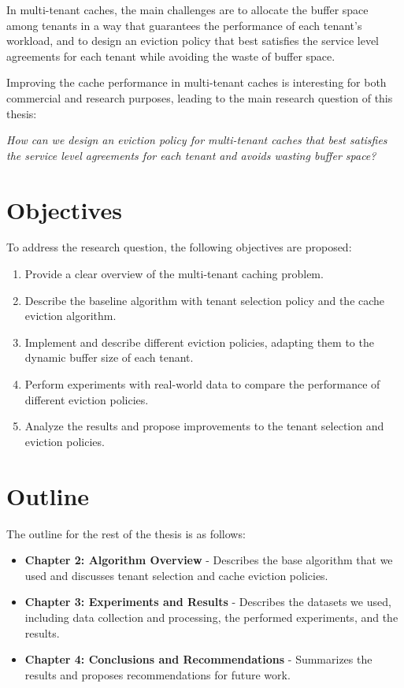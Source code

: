 In multi-tenant caches, the main challenges are to allocate the buffer space among tenants in a 
way that guarantees the performance of each tenant’s workload, and to design an eviction policy 
that best satisfies the service level agreements for each tenant while avoiding the waste of 
buffer space.

Improving the cache performance in multi-tenant caches is interesting for both commercial and 
research purposes, leading to the main research question of this thesis:

\textit{How can we design an eviction policy for multi-tenant caches that best satisfies the 
service level agreements for each tenant and avoids wasting buffer space?}

\section{Objectives}

To address the research question, the following objectives are proposed:

\begin{enumerate}
  \item Provide a clear overview of the multi-tenant caching problem.
  \item Describe the baseline algorithm with tenant selection policy and the cache eviction 
  algorithm.
  \item Implement and describe different eviction policies, adapting them to the dynamic buffer 
  size of each tenant.
  \item Perform experiments with real-world data to compare the performance of different eviction 
  policies.
  \item Analyze the results and propose improvements to the tenant selection and eviction policies.
\end{enumerate}

\section{Outline}

The outline for the rest of the thesis is as follows:

\begin{itemize}
  \item \textbf{Chapter 2: Algorithm Overview} - Describes the base algorithm that we used and 
  discusses tenant selection and cache eviction policies.
  \item \textbf{Chapter 3: Experiments and Results} - Describes the datasets we used, including 
  data collection and processing, the performed experiments, and the results.
  \item \textbf{Chapter 4: Conclusions and Recommendations} - Summarizes the results and proposes 
  recommendations for future work.
\end{itemize}